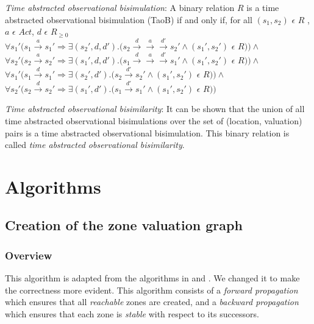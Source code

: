 \documentclass[a4paper]{llncs}
\begin{document}
\begin{definition}
  \emph{Time abstracted observational bisimulation}: A binary relation
  $R$ is a time abstracted observational bisimulation (TaoB) if and only if, for all
  $(s_1, s_2)$ $\epsilon$ $R$ , $a$ $\epsilon$ $Act $, $d$ $\epsilon$ $R_{\ge 0}$\\
  $\forall s_1' (s_1 \xrightarrow{a} s_1' \Rightarrow \exists (s_2',
  d, d') . (s_2 \xrightarrow{d} \xrightarrow{a} \xrightarrow{d'} s_2'
  \wedge (s_1', s_2')$ $\epsilon$ $R ) ) \wedge $ \\
  $\forall s_2' (s_2 \xrightarrow{a} s_2' \Rightarrow \exists (s_1',
  d, d') . (s_1 \xrightarrow{d} \xrightarrow{a} \xrightarrow{d'} s_1'
  \wedge (s_1', s_2')$ $\epsilon$ $R ) ) \wedge $ \\
  $\forall s_1' (s_1 \xrightarrow{d} s_1' \Rightarrow \exists (s_2',
  d')
  . (s_2 \xrightarrow{d'} s_2' \wedge (s_1', s_2')$ $\epsilon$ $R ) )
  \wedge $ \\
  $\forall s_2' (s_2 \xrightarrow{d} s_2' \Rightarrow \exists (s_1', d')
  . (s_1 \xrightarrow{d'} s_1' \wedge (s_1', s_2')$ $\epsilon$ $R ) ) $ \\
\end{definition}

\begin{definition}
  \emph{Time abstracted observational bisimilarity}: It can be shown that
  the union of all time abstracted observational bisimulations over the
  set of (location, valuation) pairs is a time abstracted observational
  bisimulation. This binary relation is called \textit{time abstracted
    observational bisimilarity}.
\end{definition}

\section{Algorithms}

\subsection{Creation of the zone valuation graph}

\subsubsection{Overview}

This algorithm is adapted from the algorithms in
\cite{DBLP:conf/cav/GuhaNA12} and \cite{guha2013notes}. We changed it
to make the correctness more evident. 
This algorithm consists of a \emph{forward
  propagation} which ensures that all \emph{reachable} zones are created, and a
\emph{backward propagation} which ensures that each zone is \emph{stable} with
respect to its successors. \\
\end{document}
